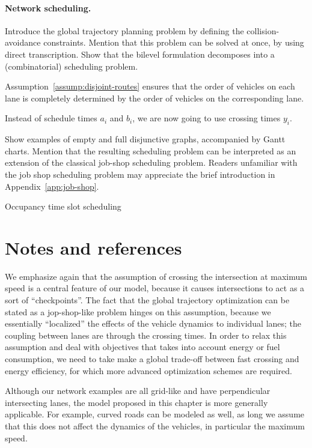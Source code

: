 \documentclass[a4paper]{report}
\theoremstyle{definition}
\theoremstyle{plain}
\begin{document}
\paragraph{Network scheduling.}
Introduce the global trajectory planning problem by defining the
collision-avoidance constraints.
Mention that this problem can be solved at once, by using direct transcription.
%
Show that the bilevel formulation decomposes into a (combinatorial) scheduling
problem.

Assumption~\ref{assump:disjoint-routes} ensures that the order of vehicles on
each lane is completely determined by the order of vehicles on the corresponding
lane.

Instead of schedule times $a_{i}$ and $b_{i}$, we are now going to use crossing
times $y_{i}$.

Show examples of empty and full disjunctive graphs, accompanied by Gantt charts.
%
Mention that the resulting scheduling problem can be interpreted as an extension
of the classical job-shop scheduling problem.
%
Readers unfamiliar with the job shop scheduling problem may appreciate the brief introduction in Appendix~\ref{app:job-shop}.

{\color{Navy} Occupancy time slot scheduling}


\section{Notes and references}

We emphasize again that the assumption of crossing the intersection at maximum
speed is a central feature of our model, because it causes intersections to act
as a sort of ``checkpoints''.
%
The fact that the global trajectory optimization can be stated as a
jop-shop-like problem hinges on this assumption, because we essentially
``localized'' the effects of the vehicle dynamics to individual lanes; the
coupling between lanes are through the crossing times.
%
In order to relax this assumption and deal with objectives that takes into
account energy or fuel consumption, we need to take make a global trade-off
between fast crossing and energy efficiency, for which more advanced
optimization schemes are required.

Although our network examples are all grid-like and have perpendicular
intersecting lanes, the model proposed in this chapter is more generally
applicable.
%
For example, curved roads can be modeled as well, as long we assume that this
does not affect the dynamics of the vehicles, in particular the maximum speed.
\end{document}
